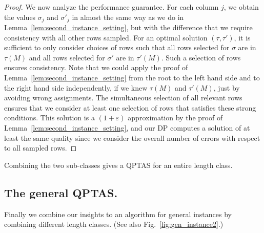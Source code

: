\begin{proof}
    We now analyze the performance guarantee. 
    For each column $j$, we obtain the values $\sigma_j$ and $\sigma'_j$ in almost the same way as we do in Lemma~\ref{lem:second_instance_setting}, but with the difference that we require consistency with all other rows sampled.
    For an optimal solution $(\tau,\tau')$, it is sufficient to only consider choices of rows such that all rows selected for $\sigma$ are in $\tau(M)$ and all rows selected for $\sigma'$ are in $\tau'(M)$.
    Such a selection of rows ensures consistency. 
    Note that we could apply the proof of Lemma~\ref{lem:second_instance_setting}  from the root to the left hand side and to the right hand side independently,
    if we knew $\tau(M)$ and $\tau'(M)$, just by avoiding wrong assignments.
    The simultaneous selection of all relevant rows ensures that we consider at least one selection of rows that satisfies these strong conditions.
    This solution is a $(1+\varepsilon)$ approximation by the proof of Lemma~\ref{lem:second_instance_setting}, and
    our DP computes a solution of at least the same quality since we consider the overall number of errors with respect to all sampled rows.
\end{proof}

Combining the two sub-classes gives a QPTAS for an entire length class.


\subsection{The general QPTAS.}\label{sec:generalQPTAS}
Finally we combine our insights to an algorithm for general instances by combining different length classes.
(See also Fig.~\ref{fig:gen_instance2}.) 

